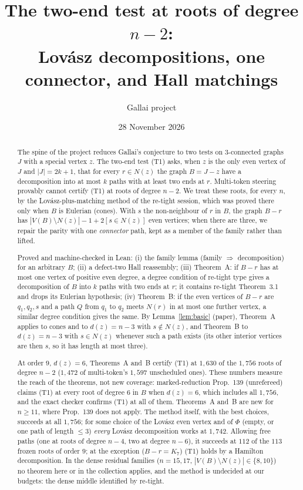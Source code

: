 \documentclass[11pt]{amsart}
\title[Test1 at roots of degree $n-2$]{The two-end test at roots of degree $n-2$:\\
Lov\'asz decompositions, one connector, and Hall matchings}
\author{Gallai project}
\date{28 November 2026}
\theoremstyle{definition}
\begin{document}
\sloppy

\begin{abstract}
The spine of the project reduces Gallai's conjecture to two tests on $3$-connected graphs $J$ with a
special vertex $z$. The two-end test (T1) asks, when $z$ is the only even vertex of $J$ and
$|J|=2k+1$, that for every $r\in N(z)$ the graph $B=J-z$ have a decomposition into at most $k$ paths
with at least two ends at $r$. Multi-token steering provably cannot certify (T1) at roots of degree
$n-2$. We treat these roots, for every $n$, by the Lov\'asz-plus-matching method of the re-tight
session, which was proved there only when $B$ is Eulerian (cones). With $s$ the non-neighbour of $r$
in $B$, the graph $B-r$ has $|V(B)\setminus N(z)|-1+2[s\in N(z)]$ even vertices; when there are three,
we repair the parity with one \emph{connector} path, kept as a member of the family rather than lifted.

Proved and machine-checked in Lean: (i) the family lemma (family $\Rightarrow$ decomposition) for an
arbitrary $B$; (ii) a defect-two Hall reassembly; (iii) Theorem~A: if $B-r$ has at most one vertex of
positive even degree, a degree condition of re-tight type gives a decomposition of $B$ into $k$ paths
with two ends at $r$; it contains re-tight Theorem~3.1 and drops its Eulerian hypothesis;
(iv) Theorem~B: if the even vertices of $B-r$ are $q_1,q_2,s$ and a path $Q$ from $q_1$ to $q_2$
meets $N(r)$ in at most one further vertex, a similar degree condition gives the same. By
Lemma~\ref{lem:basic} (paper), Theorem~A applies to cones and to $d(z)=n-3$ with $s\notin N(z)$, and
Theorem~B to $d(z)=n-3$ with $s\in N(z)$ whenever such a path exists (its other interior vertices are
then $s$, so it has length at most three).

At order $9$, $d(z)=6$, Theorems~A and~B certify (T1) at $1{,}630$ of the $1{,}756$ roots of degree
$n-2$ ($1{,}472$ of multi-token's $1{,}597$ unscheduled ones). These numbers measure the reach of the
theorems, not new coverage: marked-reduction Prop.~139 (unrefereed) claims (T1) at every root of
degree $6$ in $B$ when $d(z)=6$, which includes all $1{,}756$, and the exact checker confirms (T1) at
all of them. Theorems~A and~B are new for $n\ge11$, where Prop.~139 does not apply. The method
itself, with the best choices, succeeds at all $1{,}756$; for some choice of the Lov\'asz even vertex
and of $\Phi$ (empty, or one path of length $\le3$) \emph{every} Lov\'asz decomposition works at
$1{,}742$. Allowing free paths (one at roots of degree $n-4$, two at degree $n-6$), it succeeds at
$112$ of the $113$ frozen roots of order $9$; at the exception ($B-r=K_7$) (T1) holds by a Hamilton
decomposition. In the dense residual families ($n=15,17$, $|V(B)\setminus N(z)|\in\{8,10\}$) no theorem
here or in the collection applies, and the method is undecided at our budgets: the dense middle
identified by re-tight.
\end{abstract}
\end{document}

